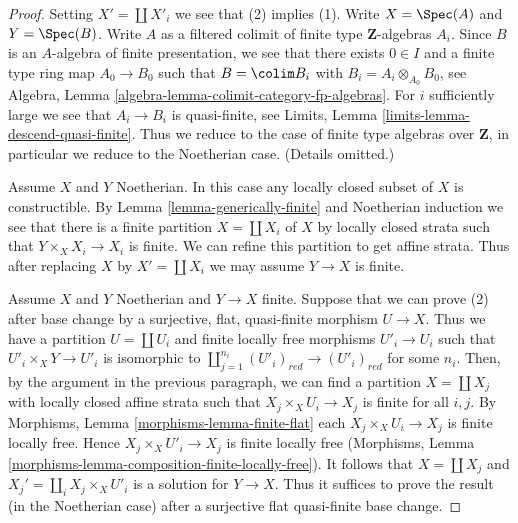 \begin{proof}
Setting $X' = \coprod X'_i$ we see that (2) implies (1).
Write $X = \Spec(A)$ and $Y = \Spec(B)$. Write $A$ as a filtered colimit
of finite type $\mathbf{Z}$-algebras $A_i$. Since $B$ is an $A$-algebra of
finite presentation, we see that there exists $0 \in I$ and a
finite type ring map $A_0 \to B_0$ such that $B = \colim B_i$ with
$B_i = A_i \otimes_{A_0} B_0$, see
Algebra, Lemma \ref{algebra-lemma-colimit-category-fp-algebras}.
For $i$ sufficiently large we see that $A_i \to B_i$ is
quasi-finite, see Limits, Lemma \ref{limits-lemma-descend-quasi-finite}.
Thus we reduce to the case of finite type algebras over $\mathbf{Z}$,
in particular we reduce to the Noetherian case. (Details omitted.)

\medskip\noindent
Assume $X$ and $Y$ Noetherian. In this case any locally closed
subset of $X$ is constructible. By Lemma \ref{lemma-generically-finite}
and Noetherian induction we see that
there is a finite partition $X = \coprod X_i$ of $X$
by locally closed strata such that $Y \times_X X_i \to X_i$ is finite.
We can refine this partition to get affine strata.
Thus after replacing $X$ by $X' = \coprod X_i$ we may assume
$Y \to X$ is finite.

\medskip\noindent
Assume $X$ and $Y$ Noetherian and $Y \to X$ finite.
Suppose that we can prove (2) after base change by a surjective,
flat, quasi-finite morphism $U \to X$. Thus we have a partition
$U = \coprod U_i$ and finite locally free morphisms $U'_i \to U_i$
such that $U'_i \times_X Y \to U'_i$ is isomorphic to
$\coprod_{j = 1}^{n_i} (U'_i)_{red} \to (U'_i)_{red}$ for some $n_i$.
Then, by the argument in the previous paragraph, we can find a
partition $X = \coprod X_j$ with locally closed affine strata such that
$X_j \times_X U_i \to X_j$ is finite for all $i, j$. By
Morphisms, Lemma \ref{morphisms-lemma-finite-flat}
each $X_j \times_X U_i \to X_j$ is finite locally free.
Hence $X_j \times_X U'_i \to X_j$ is finite locally free
(Morphisms, Lemma \ref{morphisms-lemma-composition-finite-locally-free}).
It follows that $X = \coprod X_j$ and $X_j' = \coprod_i X_j \times_X U'_i$
is a solution for $Y \to X$. Thus it suffices to prove
the result (in the Noetherian case) after a surjective flat quasi-finite
base change.


\end{proof}
